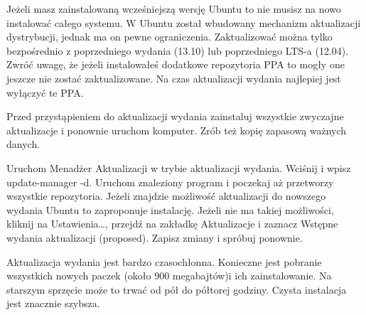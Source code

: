 Jeżeli masz zainstalowaną wcześniejszą wersję Ubuntu to nie musisz na nowo instalować całego systemu. W Ubuntu został wbudowany mechanizm aktualizacji dystrybucji, jednak ma on pewne ograniczenia. Zaktualizować można tylko bezpośrednio z poprzedniego wydania (13.10) lub poprzedniego LTS-a (12.04). Zwróć uwagę, że jeżeli instalowałeś dodatkowe repozytoria PPA to mogły one jeszcze nie zostać zaktualizowane. Na czas aktualizacji wydania najlepiej jest wyłączyć te PPA.

Przed przystąpieniem do aktualizacji wydania zainstaluj wszystkie zwyczajne aktualizacje i ponownie uruchom komputer. Zrób też kopię zapasową ważnych danych.

Uruchom Menadżer Aktualizacji w trybie aktualizacji wydania. Wciśnij  i wpisz \textcolor{ubuntu_orange}{update-manager -d}. Uruchom znaleziony program i poczekaj aż przetworzy wszystkie repozytoria. Jeżeli znajdzie możliwość aktualizacji do nowszego wydania Ubuntu to zaproponuje instalację. Jeżeli nie ma takiej możliwości, kliknij na \textcolor{ubuntu_orange}{Ustawienia\ldots}, przejdź na zakładkę \textcolor{ubuntu_orange}{Aktualizacje} i zaznacz \textcolor{ubuntu_orange}{Wstępne wydania aktualizacji (proposed)}. Zapisz zmiany i spróbuj ponownie.

Aktualizacja wydania jest bardzo czasochłonna. Konieczne jest pobranie wszystkich nowych paczek (około 900 megabajtów)i ich zainstalowanie. Na starszym sprzęcie może to trwać od pół do półtorej godziny. Czysta instalacja jest znacznie szybsza.